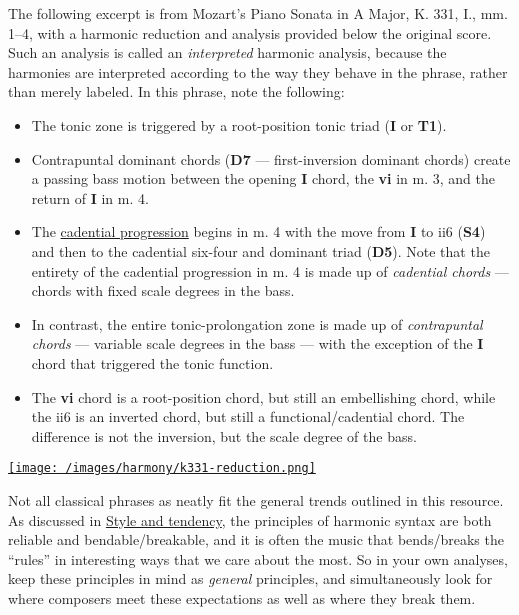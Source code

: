 \documentclass{book}
\providecommand{\tightlist}{%
  \setlength{\itemsep}{0pt}\setlength{\parskip}{0pt}}
\begin{document}
The following excerpt is from Mozart's Piano Sonata in A Major, K. 331, I.,
mm. 1--4, with a harmonic reduction and analysis provided below the original
score. Such an analysis is called an \emph{interpreted} harmonic analysis,
because the harmonies are interpreted according to the way they behave in the
phrase, rather than merely labeled. In this phrase, note the following:

\begin{itemize}
\tightlist
\item
  The tonic zone is triggered by a root-position tonic triad (\textbf{I} or
  \textbf{T1}).\\
\item
  Contrapuntal dominant chords (\textbf{D7} --- first-inversion dominant
  chords) create a passing bass motion between the opening \textbf{I} chord,
  the \textbf{vi} in m. 3, and the return of \textbf{I} in m. 4.\\
\item
  The \href{harmonicAnalysis}{cadential progression} begins in m. 4 with the
  move from \textbf{I} to ii6 (\textbf{S4}) and then to the cadential six-four
  and dominant triad (\textbf{D5}). Note that the entirety of the cadential
  progression in m. 4 is made up of \emph{cadential chords} --- chords with
  fixed scale degrees in the bass.\\
\item
  In contrast, the entire tonic-prolongation zone is made up of
  \emph{contrapuntal chords} --- variable scale degrees in the bass --- with
  the exception of the \textbf{I} chord that triggered the tonic function.\\
\item
  The \textbf{vi} chord is a root-position chord, but still an embellishing
  chord, while the ii6 is an inverted chord, but still a functional/cadential
  chord. The difference is not the inversion, but the scale degree of the
  bass.
\end{itemize}

\href{/images/harmony/k331-reduction.png}{\texttt{[image: /images/harmony/k331-reduction.png]}}

Not all classical phrases as neatly fit the general trends outlined in this
resource. As discussed in \href{tendency}{Style and tendency}, the principles
of harmonic syntax are both reliable and bendable/breakable, and it is often
the music that bends/breaks the ``rules'' in interesting ways that we care
about the most. So in your own analyses, keep these principles in mind as
\emph{general} principles, and simultaneously look for where composers meet
these expectations as well as where they break them.
\end{document}
